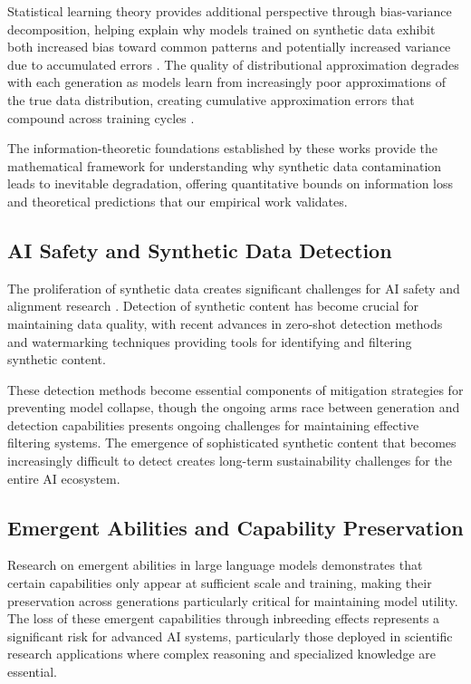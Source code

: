 \documentclass{article}
\begin{document}
Statistical learning theory provides additional perspective through bias-variance decomposition, helping explain why models trained on synthetic data exhibit both increased bias toward common patterns and potentially increased variance due to accumulated errors \cite{hastie2009elements}. The quality of distributional approximation degrades with each generation as models learn from increasingly poor approximations of the true data distribution, creating cumulative approximation errors that compound across training cycles \cite{wasserman2006all}.

The information-theoretic foundations established by these works provide the mathematical framework for understanding why synthetic data contamination leads to inevitable degradation, offering quantitative bounds on information loss and theoretical predictions that our empirical work validates.

\subsection{AI Safety and Synthetic Data Detection}

The proliferation of synthetic data creates significant challenges for AI safety and alignment research \cite{bommasani2021opportunities, kenton2021alignment}. Detection of synthetic content has become crucial for maintaining data quality, with recent advances in zero-shot detection methods \cite{mitchell2023detectgpt} and watermarking techniques \cite{kirchenbauer2023watermark} providing tools for identifying and filtering synthetic content.

These detection methods become essential components of mitigation strategies for preventing model collapse, though the ongoing arms race between generation and detection capabilities presents ongoing challenges for maintaining effective filtering systems. The emergence of sophisticated synthetic content that becomes increasingly difficult to detect creates long-term sustainability challenges for the entire AI ecosystem.

\subsection{Emergent Abilities and Capability Preservation}

Research on emergent abilities in large language models \cite{wei2022emergent} demonstrates that certain capabilities only appear at sufficient scale and training, making their preservation across generations particularly critical for maintaining model utility. The loss of these emergent capabilities through inbreeding effects represents a significant risk for advanced AI systems, particularly those deployed in scientific research applications where complex reasoning and specialized knowledge are essential.
\end{document}
